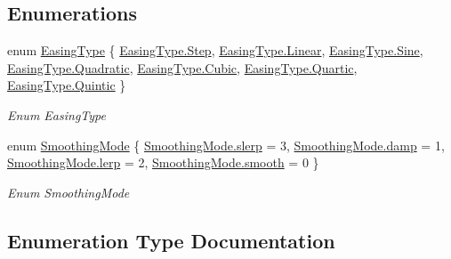 \subsection*{Enumerations}
\begin{DoxyCompactItemize}
\item 
enum \hyperlink{namespace_radical_library_a2d6877adaf2ec492cf30c572aa684e6f}{Easing\+Type} \{ \newline
\hyperlink{namespace_radical_library_a2d6877adaf2ec492cf30c572aa684e6fa48c7c41b72e1d678923ce3571aa65b2d}{Easing\+Type.\+Step}, 
\hyperlink{namespace_radical_library_a2d6877adaf2ec492cf30c572aa684e6fa32a843da6ea40ab3b17a3421ccdf671b}{Easing\+Type.\+Linear}, 
\hyperlink{namespace_radical_library_a2d6877adaf2ec492cf30c572aa684e6fa6ca9e2d793f678aba7c1b19526592a46}{Easing\+Type.\+Sine}, 
\hyperlink{namespace_radical_library_a2d6877adaf2ec492cf30c572aa684e6fa8b2972385ed28d0e199ae2985d6fea4c}{Easing\+Type.\+Quadratic}, 
\newline
\hyperlink{namespace_radical_library_a2d6877adaf2ec492cf30c572aa684e6faec6b5414eb175379ff9efc9b3eef5814}{Easing\+Type.\+Cubic}, 
\hyperlink{namespace_radical_library_a2d6877adaf2ec492cf30c572aa684e6fa884b16485227c5da72c09b668fd7e1da}{Easing\+Type.\+Quartic}, 
\hyperlink{namespace_radical_library_a2d6877adaf2ec492cf30c572aa684e6fa29c67dc92b59a55961609c1dc546280a}{Easing\+Type.\+Quintic}
 \}\begin{DoxyCompactList}\small\item\em Enum Easing\+Type \end{DoxyCompactList}
\item 
enum \hyperlink{namespace_radical_library_a53ca8c4ff40f917ad8d03bb2c0dbd548}{Smoothing\+Mode} \{ \hyperlink{namespace_radical_library_a53ca8c4ff40f917ad8d03bb2c0dbd548ab3e5b7b54ffda84cdd1cfffb503170be}{Smoothing\+Mode.\+slerp} = 3, 
\hyperlink{namespace_radical_library_a53ca8c4ff40f917ad8d03bb2c0dbd548a88fcc23b74f16d118617cefb688c83b6}{Smoothing\+Mode.\+damp} = 1, 
\hyperlink{namespace_radical_library_a53ca8c4ff40f917ad8d03bb2c0dbd548af276cc520db3c6e67c238feefa5130ab}{Smoothing\+Mode.\+lerp} = 2, 
\hyperlink{namespace_radical_library_a53ca8c4ff40f917ad8d03bb2c0dbd548aa7887cc809cf0d4df17fc5dafd03e4e7}{Smoothing\+Mode.\+smooth} = 0
 \}\begin{DoxyCompactList}\small\item\em Enum Smoothing\+Mode \end{DoxyCompactList}
\end{DoxyCompactItemize}


\subsection{Enumeration Type Documentation}
\mbox{\label{namespace_radical_library_a2d6877adaf2ec492cf30c572aa684e6f}} 
